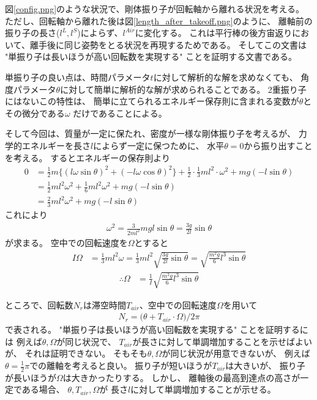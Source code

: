\documentclass[a4paper,11pt]{jsarticle}
\begin{document}
図\ref{config.png}のような状況で、剛体振り子が回転軸から離れる状況を考える。
ただし、回転軸から離れた後は図\ref{length_after_takeoff.png}のように、
離軸前の振り子の長さ($l^L, l^S$)によらず、$l^{Air}$に変化する。
これは平行棒の後方宙返りにおいて、離手後に同じ姿勢をとる状況を再現するためである。
そしてこの文書は
"単振り子は長いほうが高い回転数を実現する"
ことを証明する文書である。

単振り子の良い点は、時間パラメータ$t$に対して解析的な解を求めなくても、
角度パラメータ$\theta$に対して簡単に解析的な解が求められることである。
2重振り子にはないこの特性は、
簡単に立てられるエネルギー保存則に含まれる変数が$\theta$とその微分である$\omega$
だけであることによる。

そして今回は、質量が一定に保たれ、密度が一様な剛体振り子を考えるが、
力学的エネルギーを長さ$l$によらず一定に保つために、
水平$\theta = 0$から振り出すことを考える。
するとエネルギーの保存則より
\begin{align}
  0 
  &= \frac{1}{2} m \Big\{ (l\omega\sin\theta)^2 + (-l\omega\cos\theta)^2  \Big\}
  + \frac{1}{2} \cdot \frac{1}{3} ml^2 \cdot \omega^2
  + mg (-l \sin\theta )
  \\
  &= \frac{1}{2}ml^2\omega^2 + \frac{1}{6}ml^2\omega^2 + mg (-l\sin\theta)
  \\
  &= \frac{2}{3}ml^2\omega^2 + mg (-l\sin\theta)
\end{align}
これにより
\begin{align}
  \omega^2 = \frac{3}{2ml^2}mgl\sin\theta = \frac{3g}{2l}\sin\theta
\end{align}
が求まる。
空中での回転速度を$\Omega$とすると
\begin{align}
  I\Omega 
  &= \frac{1}{3}ml^2\omega
  = \frac{1}{3}ml^2 \sqrt{ \frac{3g}{2l}\sin\theta }
  = \sqrt{ \frac{m^2 g}{6} l^3 \sin\theta }
\end{align}
\begin{align}
  \therefore \Omega
  &= \frac{1}{I} \sqrt{ \frac{m^2 g}{6} l^3 \sin\theta }
  \label{eq:Omega}
\end{align}

ところで、回転数$N_r$は滞空時間$T_{air}$、空中での回転速度$\Omega$を用いて
\begin{align}
  N_r = \Big( \theta + T_{air} \cdot \Omega \Big) / 2\pi
\end{align}
で表される。
"単振り子は長いほうが高い回転数を実現する"
ことを証明するには
例えば$\theta, \Omega$が同じ状況で、
$T_{air}$が長さに対して単調増加することを示せばよいが、
それは証明できない。
そもそも$\theta, \Omega$が同じ状況が用意できないが、
例えば$\theta=\frac{1}{2}\pi$での離軸を考えると良い。
振り子が短いほうが$T_{air}$は大きいが、
振り子が長いほうが$\Omega$は大きかったりする。
しかし、
離軸後の最高到達点の高さが一定である場合、
$\theta, T_{air}, \Omega$が
長さ$l$に対して単調増加することが示せる。
\end{document}
